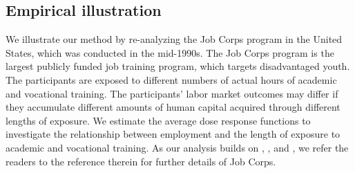 \documentclass[lettersize, 12pt]{article}
\begin{document}


\subsection{Empirical illustration}
We illustrate our method by re-analyzing the Job Corps program in the United States, which was conducted in the mid-1990s.
The Job Corps program is the largest publicly funded job training program, which targets disadvantaged youth.
The participants are exposed to different numbers of actual hours of academic and vocational training.
The participants' labor market outcomes may differ if they accumulate different amounts of human capital acquired through different lengths of exposure.
We estimate the average dose response functions to investigate the relationship between employment and the length of exposure to academic and vocational training.
As our analysis builds on \cite{FFGN12ReStat}, \cite{HHLP}, and \cite{Lee}, we refer the readers to the reference therein for further details of Job Corps.
\end{document}
